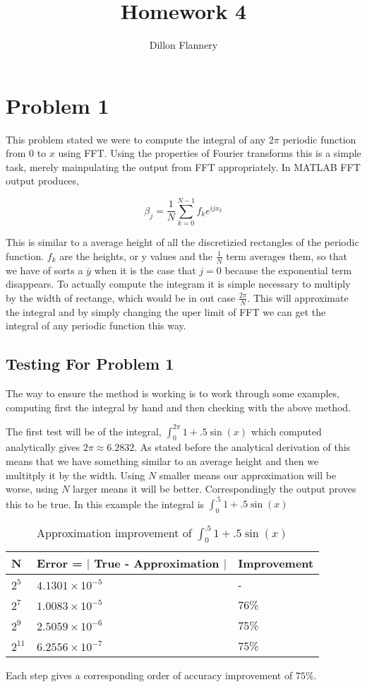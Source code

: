 \documentclass[]{article}
\title{Homework 4}
\author{Dillon Flannery}
\begin{document}
\maketitle

\section*{Problem 1}
This problem stated we were to compute the integral of any 2$ \pi $ periodic function from $ 0 $ to $ x $ using FFT. Using the properties of Fourier transforms this is a simple task, merely mainpulating the output from FFT appropriately. In MATLAB FFT output produces, 

\[ \beta_j = \frac{1}{N}\sum_{k=0}^{N-1} f_k e^{ijx_k} \]

This is similar to a average height of all the discretizied rectangles of the periodic function. $ f_k $ are the heights, or y values and the $ \frac{1}{N} $ term averages them, so that we have of sorts a $ \bar{y} $ when it is the case that $ j=0 $ because the exponential term disappears. To actually compute the integram it is simple necessary to multiply by the width of rectange, which would be in out case $ \frac{2\pi}{N} $. This will approximate the integral and by simply changing the uper limit of FFT we can get the integral of any periodic function this way. 

\subsection*{Testing For Problem 1}
The way to ensure the method is working is to work through some examples, computing first the integral by hand and then checking with the above method. 

The first test will be of the integral, $ \int_{0}^{2\pi} 1 + .5 \sin(x) $ which computed analytically gives $ 2\pi \approx 6.2832 $. As stated before the analytical derivation of this means that we have something similar to an average height and then we multitply it by the width. Using $ N $ smaller means our approximation will be worse, using $ N $ larger means it will be better. Correspondingly the output proves this to be true. In this example the integral is $\int_{0}^{.5} 1 + .5 \sin(x)  $ \\

\centering
	\begin{table}[H]
		\centering
\begin{tabular}{lll}
	N & Error = $|$ True - Approximation $|  $ & Improvement\\
	\hline 
	$ 2^5 $ & $ 4.1301 \times 10^{-5} $ & - \\
	$ 2^7 $ & $ 1.0083 \times 10^{-5} $ & 76\% \\
	$ 2^9 $ &  $2.5059\times10^{-6} $ &  75\% \\
	$ 2^{11} $ & $ 6.2556 \times10^{-7} $ &  75\% \\
	\hline 
\end{tabular}
\caption{Approximation improvement of $\int_{0}^{.5} 1 + .5 \sin(x)  $}
\end{table}
Each step gives a corresponding order of accuracy improvement of $ 75\% $. 
\end{document}
